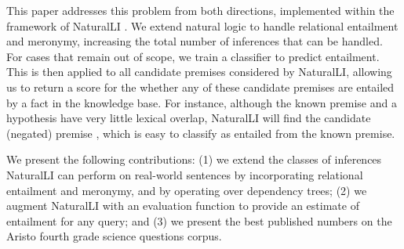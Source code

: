 This paper addresses this problem from both directions, implemented within the
  framework of NaturalLI \cite{key:2014angeli-naturalli}.
We extend natural logic to handle relational entailment 
  and meronymy, increasing the total number of inferences that can be handled.
For cases that remain out of scope, we train a classifier to predict 
  entailment.
This is then applied to all candidate premises considered by 
  NaturalLI, allowing us to return a score for the 
  whether any of these candidate premises are entailed by
  a fact in the knowledge base.
For instance, although the known premise  
  and a hypothesis  
  have very little lexical overlap, NaturalLI
  will find the candidate (negated) premise ,
  which is easy to classify as entailed from the known premise.
  


We present the following contributions:
(1) we extend the classes of inferences NaturalLI can perform on real-world 
    sentences by
   incorporating relational entailment and meronymy, and by operating over 
   dependency trees;
(2) we augment NaturalLI with an evaluation function to provide an estimate of entailment
  for any query;
and 
(3) we present the best
    published numbers on the Aristo fourth grade science questions corpus.


